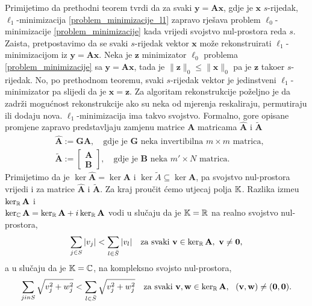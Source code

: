 \documentclass[a4paper,twoside,12pt]{memoir} %
\newcommand{\vect}[1]{\mathbf{#1}}
\renewcommand{\vec}{\vect}
\newcommand{\norm}[1]{\|{#1}\|}
\begin{document}
Primijetimo da prethodni teorem tvrdi da za svaki $\vec y = \vec{Ax}$, gdje je $\vec x$ $s$-rijedak, $\ell_1$-minimizacija \eqref{problem_minimizacije_l1} zapravo rje\v{s}ava problem $\ell_0$-minimizacije \eqref{problem_minimizacije} kada vrijedi svojstvo nul-prostora reda $s$. Zaista, pretpostavimo da se svaki $s$-rijedak vektor $\vec{x}$ mo\v{z}e rekonstruirati $\ell_1$-minimizacijom iz $\vec y = \vec{Ax}$. Neka je $\vec z$ minimizator $\ell_0$ problema \eqref{problem_minimizacije} sa $\vec y = \vec{Ax}$, tada je $\norm{\vec z}_0 \leq \norm{\vec x}_0$ pa je $\vec z$ tako\dj er $s$-rijedak. No, po prethodnom teoremu, svaki $s$-rijedak vektor je jedinstveni $\ell_1$-minimizator pa slijedi da je $\vec x = \vec z$.
\newline \indent
Za algoritam rekonstrukcije po\v{z}eljno je da zadr\v{z}i mogu\'cnost rekonstrukcije ako su neka od mjerenja reskaliraju, permutiraju ili dodaju nova. $\ell_1$-minimizacija ima takvo svojstvo. Formalno, gore opisane promjene zapravo predstavljaju zamjenu matrice $\vec A$ matricama $\vec{\hat A}$ i $\vec{\tilde A}$
\begin{align*}
    & \vec{\hat A} := \vec{GA}, \quad \text{gdje je }\vec{G}\text{ neka invertibilna }m \times m \text{ matrica},\\
    & \vec{\tilde A} := 
    \begin{bmatrix*}
        \vec A \\ \vec B
    \end{bmatrix*}
    , \quad \text{gdje je }\vec{B}\text{ neka }m' \times N \text{ matrica}.
\end{align*}
Primijetimo da je $\ker \vec{\hat A} = \ker \vec A$ i $\ker \tilde A \subseteq \ker \vec A$, pa svojstvo nul-prostora vrijedi i za matrice $\vec{\hat A}$ i $\vec{\tilde A}$.
\newline
\newline
\indent
Za kraj prou\v{c}it \'cemo utjecaj polja $\mathbb{K}$. Razlika izme\dj u $\ker_{\R}\vec A$ i\\ $\ker_{\C} \vec A = \ker_{\R} \vec A + i \ker_{\R} \vec A$ vodi u slu\v{c}aju da je $\mathbb{K}=\mathbb{R}$ na realno svojstvo nul-prostora, 
\begin{equation}\label{svojstvo_nul_prostora_realno}
    \sum_{j \in S}|v_j| < \sum_{l \in \bar{S}}|v_l| \quad \text{za svaki } \vec v \in \ker_{\R} \vec A,\ \vec v \neq \vec 0,  
\end{equation}
a u slu\v{c}aju da je $\mathbb{K} = \mathbb{C}$, na kompleksno svojsto nul-prostora,
\begin{equation}\label{svojstvo_nul_prostora_kompleksno}
    \sum_{j in S}\sqrt{v_j^2 + w_j^2} < \sum_{l \in \bar{S}}\sqrt{v_j^2 + w_j^2}\quad \text{za svaki } \vec v, \vec w \in \ker_{\R} \vec A,\ \ ( \vec v, \vec w ) \neq \vec (\vec 0,\vec 0).  
\end{equation}
\end{document}
